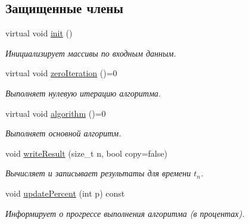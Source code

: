 \subsection*{Защищенные члены}
\begin{DoxyCompactItemize}
\item 
\hypertarget{class_core_1_1_filter_ae8bb3b004400941317a1e9fdc1ca2c58}{}\label{class_core_1_1_filter_ae8bb3b004400941317a1e9fdc1ca2c58} 
virtual void \hyperlink{class_core_1_1_filter_ae8bb3b004400941317a1e9fdc1ca2c58}{init} ()
\begin{DoxyCompactList}\small\item\em Инициализирует массивы по входным данным. \end{DoxyCompactList}\item 
\hypertarget{class_core_1_1_filter_af95880b734c4b8dc3d8c02f222b32506}{}\label{class_core_1_1_filter_af95880b734c4b8dc3d8c02f222b32506} 
virtual void \hyperlink{class_core_1_1_filter_af95880b734c4b8dc3d8c02f222b32506}{zero\+Iteration} ()=0
\begin{DoxyCompactList}\small\item\em Выполняет нулевую итерацию алгоритма. \end{DoxyCompactList}\item 
\hypertarget{class_core_1_1_filter_a438681ee3e54aba2148042d9f8011ab8}{}\label{class_core_1_1_filter_a438681ee3e54aba2148042d9f8011ab8} 
virtual void \hyperlink{class_core_1_1_filter_a438681ee3e54aba2148042d9f8011ab8}{algorithm} ()=0
\begin{DoxyCompactList}\small\item\em Выполняет основной алгоритм. \end{DoxyCompactList}\item 
void \hyperlink{class_core_1_1_filter_a84c7d1ebe3931974c3beccf27f13c1c5}{write\+Result} (size\+\_\+t n, bool copy=false)
\begin{DoxyCompactList}\small\item\em Вычисляет и записывает результаты для времени $t_n$. \end{DoxyCompactList}\item 
\hypertarget{class_core_1_1_filter_a78692f8ecdfe6e2170a5d5acb0f69210}{}\label{class_core_1_1_filter_a78692f8ecdfe6e2170a5d5acb0f69210} 
void \hyperlink{class_core_1_1_filter_a78692f8ecdfe6e2170a5d5acb0f69210}{update\+Percent} (int p) const
\begin{DoxyCompactList}\small\item\em Информирует о прогрессе выполнения алгоритма (в процентах). \end{DoxyCompactList}\end{DoxyCompactItemize}

